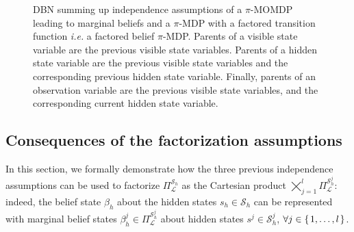 \begin{figure}[b!]
\caption[DBN of a factored belief-independent $\pi$-MOMDP]{
DBN summing up independence assumptions of a $\pi$-MOMDP
leading to marginal beliefs and a $\pi$-MDP with 
a factored transition function \textit{i.e.} a factored belief $\pi$-MDP.
Parents of a visible state variable are the previous visible state variables.
Parents of a hidden state variable are the previous visible state variables 
and the corresponding previous hidden state variable. 
Finally,
parents of an observation variable are the previous visible state variables,
and the corresponding current hidden state variable.
}
\label{fig_piMOMDPFact}
\end{figure}

\subsection{Consequences of the factorization assumptions}
\label{section_factoAssumptions}
In this section, we formally demonstrate how the three previous independence assumptions can be
used to factorize $\Pi^{\mathcal{S}_h}_{\mathcal{L}}$ 
as the Cartesian product $\displaystyle \bigtimes_{j=1}^{l} \Pi^{\mathcal{S}^j_h}_{\mathcal{L}}$:
indeed, the belief state $\beta_h$ about the hidden states $s_h \in \mathcal{S}_h$ 
can be represented with marginal belief states $\beta^j_h \in \Pi^{\mathcal{S}^j_h}_{\mathcal{L}}$
about hidden states $s^j \in \mathcal{S}^j_h$, $\forall j \in \left\{ \left. 1,\ldots,l \right. \right\}$.

